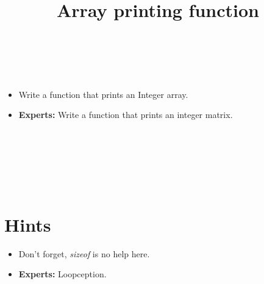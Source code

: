 


\title{Array printing function} %
\author{} %
\renewcommand{\difficulty}{Medium} %
\renewcommand{\requirements}{Array, Loops} %
\renewcommand{\aims}{Iterate through an Array} %


 \maketitle
 \taskinfos

\ \\\ \\
\begin{itemize}
	\item Write a function that prints an Integer array.
	\item \textbf{Experts:} Write a function that prints an integer matrix.
\end{itemize}	
 
 
\ \\\ \\\ \\\ \\\ \\
\section*{Hints}
	\begin{itemize}
		\item Don't forget, \textit{sizeof} is no help here.
		\item \textbf{Experts:} Loopception.
	\end{itemize}
 

